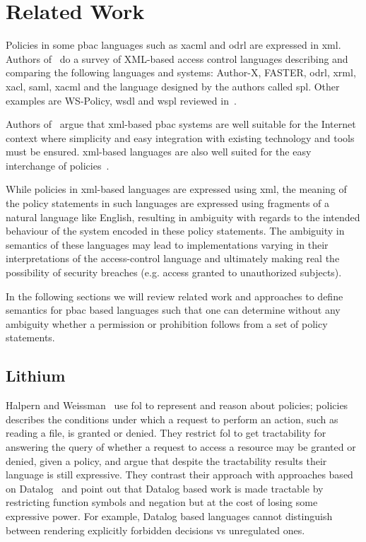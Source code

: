 \chapter{Related Work}


Policies in some \ac{pbac} languages such as \ac{xacml} and \ac{odrl} are expressed in \ac{xml}. Authors of~\cite{surveyXML} do a survey of XML-based access control languages describing and comparing the following languages and systems: Author-X, FASTER, \ac{odrl}, \ac{xrml}, \ac{xacl}, \ac{saml}, \ac{xacml} and the language designed by the authors called \ac{spl}. Other examples are WS-Policy, \ac{wsdl} and \ac{wspl} reviewed in~\cite{ArdagnaDVS04}.

Authors of~\cite{ArdagnaDVS04} argue that \ac{xml}-based \ac{pbac} systems are well suitable for the Internet context where simplicity and easy integration with existing technology and tools must be ensured. \ac{xml}-based languages are also well suited for the easy interchange of policies~\cite{ArdagnaDVS04}. 

While policies in \ac{xml}-based languages are expressed using \ac{xml}, the meaning of the policy statements in such languages are expressed using fragments of a natural language like English, resulting in ambiguity with regards to the intended behaviour of the system encoded in these policy statements. The ambiguity in semantics of these languages may lead to implementations varying in their interpretations of the access-control language and ultimately making real the possibility of security breaches (e.g. access granted to unauthorized subjects). 

In the following sections we will review related work and approaches to define semantics for \ac{pbac} based languages such that one can determine without any ambiguity whether a permission or prohibition follows from a set of policy statements.
 
\section{Lithium}
Halpern and Weissman~\cite{Halpern2008} use \ac{fol} to represent and reason about policies; policies describes the conditions under which a request to perform an action, such as reading a file, is granted or denied. They restrict \ac{fol} to get tractability for answering the query of whether a request to access a resource may be granted or denied, given a policy, and argue that despite the tractability results their language is still expressive. They contrast their approach with approaches based on Datalog~\cite{datalog} and point out that Datalog based work is made tractable by restricting function symbols and negation but at the cost of losing some expressive power. For example, Datalog based languages cannot distinguish between rendering explicitly forbidden decisions vs unregulated ones.


